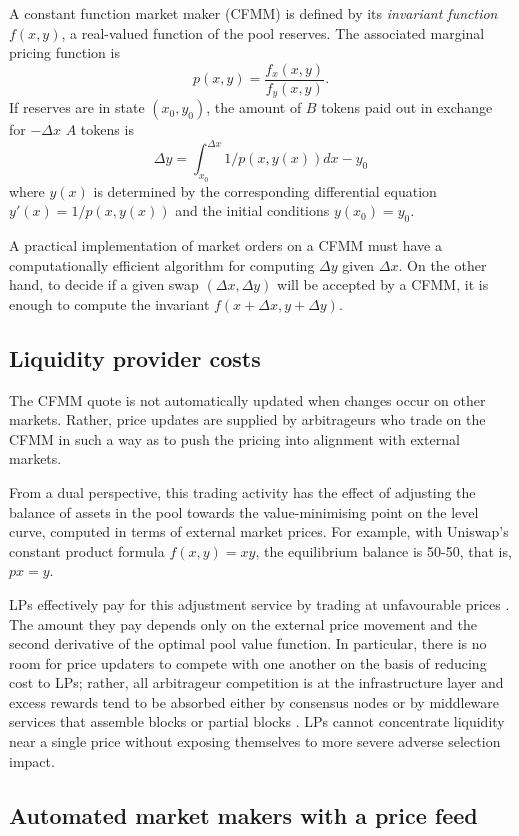 \documentclass[a4paper,10pt]{article}
\theoremstyle{remark}
\begin{document}
A constant function market maker (CFMM) is defined by its \emph{invariant function} $f(x,y)$, a real-valued function of the pool reserves.
%
The associated marginal pricing function is 
\[
  p(x,y) = \frac{f_x(x,y)}{f_y(x,y)}.
\]
If reserves are in state $(x_0,y_0)$, the amount of $B$ tokens paid out in exchange for $-\Delta x$ $A$ tokens is
\[
  \Delta y = \int_{x_0}^{\Delta x} 1/p(x,y(x))dx - y_0
\]
where $y(x)$ is determined by the corresponding differential equation $y'(x) = 1/p(x,y(x))$ and the initial conditions $y(x_0)=y_0$.

A practical implementation of market orders on a CFMM must have a computationally efficient algorithm for computing $\Delta y$ given $\Delta x$.
%
On the other hand, to decide if a given swap $(\Delta x, \Delta y)$ will be accepted by a CFMM, it is enough to compute the invariant $f(x+\Delta x,y+\Delta y)$.

\subsection{Liquidity provider costs}

The CFMM quote is not automatically updated when changes occur on other markets. 
%
Rather, price updates are supplied by arbitrageurs who trade on the CFMM in such a way as to push the pricing into alignment with external markets. 

From a dual perspective, this trading activity has the effect of adjusting the balance of assets in the pool towards the value-minimising point on the level curve, computed in terms of external market prices. 
%
For example, with Uniswap's constant product formula $f(x,y)=xy$, the equilibrium balance is 50-50, that is, $px=y$.

LPs effectively pay for this adjustment service by trading at unfavourable prices \cite{milionis2022automated}.
%
The amount they pay depends only on the external price movement and the second derivative of the optimal pool value function.
%
In particular, there is no room for price updaters to compete with one another on the basis of reducing cost to LPs; rather, all arbitrageur competition is at the infrastructure layer and excess rewards tend to be absorbed either by consensus nodes or by middleware services that assemble blocks or partial blocks \cite{daian2020flash}.
%
LPs cannot concentrate liquidity near a single price without exposing themselves to more severe adverse selection impact.

\subsection{Automated market makers with a price feed}
\label{price-feed}
\end{document}
